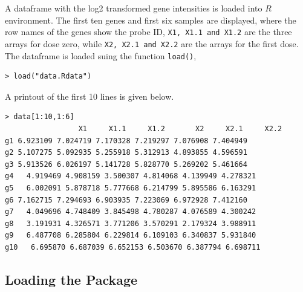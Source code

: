 \documentclass[10pt]{article}
\newenvironment{boxit}{\begin{lrbox}{\savepar}
\begin{minipage}[b]{5.0in}}
{\end{minipage}\end{lrbox}\fbox{\usebox{\savepar}}}
\begin{document}
A dataframe with the log2 transformed gene intensities is loaded
into $R$ environment. The first ten genes and first six samples are
displayed, where the row names of the genes show the probe ID,
\texttt{X1, X1.1 and X1.2} are the three arrays for dose zero, while
\texttt{X2, X2.1 and X2.2} are the arrays for the first dose. The dataframe is loaded suing the function \texttt{load()},
\begin{center}
\begin{boxit}
\begin{verbatim}
> load("data.Rdata")
\end{verbatim}
\end{boxit}
\end{center}
A printout of the first 10 lines is given below.
\begin{center}
\begin{boxit}
\begin{verbatim}
> data[1:10,1:6]
                 X1     X1.1     X1.2       X2     X2.1     X2.2
g1 6.923109 7.024719 7.170328 7.219297 7.076908 7.404949
g2 5.107275 5.092935 5.255918 5.312913 4.893855 4.596591
g3 5.913526 6.026197 5.141728 5.828770 5.269202 5.461664
g4   4.919469 4.908159 3.500307 4.814068 4.139949 4.278321
g5   6.002091 5.878718 5.777668 6.214799 5.895586 6.163291
g6 7.162715 7.294693 6.903935 7.223069 6.972928 7.412160
g7   4.049696 4.748409 3.845498 4.780287 4.076589 4.300242
g8   3.191931 4.326571 3.771206 3.570291 2.179324 3.988911
g9   6.487708 6.285804 6.229814 6.109103 6.340837 5.931840
g10   6.695870 6.687039 6.652153 6.503670 6.387794 6.698711
\end{verbatim}
\end{boxit}
\end{center}

\subsection{Loading the Package}

\end{document}
